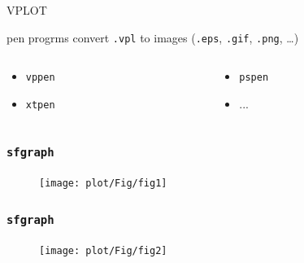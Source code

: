 \begin{frame}{VPLOT}
  \begin{block}{}
    pen progrms convert \texttt{.vpl} to images (\texttt{.eps}, \texttt{.gif}, \texttt{.png}, \ldots)
  \end{block}

  \begin{columns}[t]
    \begin{column}[T]{.5\textwidth}
      \begin{itemize}
      \item \texttt{vppen}
      \item \texttt{xtpen}
      \end{itemize}
    \end{column}
    \begin{column}[T]{.5\textwidth}
      \begin{itemize}
      \item \texttt{pspen}
      \item ...
      \end{itemize} 
    \end{column}
  \end{columns}
  
\end{frame}


\begin{frame}
  \frametitle{\texttt{sfgraph}}
  
  \begin{figure}
    \texttt{[image: plot/Fig/fig1]}
  \end{figure}
\end{frame}

\begin{frame}
  \frametitle{\texttt{sfgraph}}
  
  \begin{figure}
    \texttt{[image: plot/Fig/fig2]}
  \end{figure}
\end{frame}

